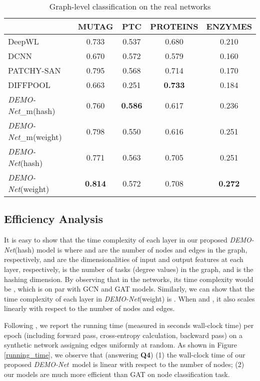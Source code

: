 \documentclass[sigconf]{acmart}
\newcommand{\demonet}{{\emph {DEMO-Net}}}
\begin{document}
\begin{table}
    \centering
    \caption{Graph-level classification on the real networks}
    \small
    \begin{tabular}{|l|c|c|c|c|}
    \hline
         &  MUTAG & PTC  & PROTEINS & ENZYMES   \\ \hline
         DeepWL~\cite{yanardag2015deep} & 0.733 & 0.537  & 0.680  & 0.210   \\ \hline
         DCNN~\cite{atwood2016diffusion}   & 0.670  & 0.572 & 0.579   & 0.160  \\ \hline
         PATCHY-SAN~\cite{niepert2016learning} & 0.795  & 0.568  & 0.714  & 0.170   \\ \hline
         DIFFPOOL~\cite{ying2018hierarchical} & 0.663  & 0.251 & \textbf{0.733 } & 0.184  \\ \hline
         \hline
         \demonet\_m(hash)   & 0.760  & \textbf{0.586}  & 0.617  & 0.236  \\ \hline
         \demonet\_m(weight)   & 0.798  & 0.550  & 0.616 &  0.251 \\ \hline
         \demonet (hash)   & 0.771  & 0.563  & 0.705 & 0.251  \\ \hline
         \demonet (weight) & \textbf{0.814} & 0.572 & 0.708  & \textbf{0.272} \\ \hline
    \end{tabular}
    \label{tab:graph_classification}
    \vspace{-3mm}
\end{table}





\subsection{Efficiency Analysis}
It is easy to show that the time complexity of each layer in our proposed \demonet (hash) model is  where  and  are the number of nodes and edges in the graph, respectively,  and  are the dimensionalities of input and output features at each layer, respectively,  is the number of tasks (degree values) in the graph, and  is the hashing dimension. By observing that  in the networks, its time complexity would be , which is on par with GCN and GAT models. Similarly, we can show that the time complexity of each layer in \demonet(weight) is . When  and , it also scales linearly with respect to the number of nodes and edges.

Following \cite{kipf2016semi}, we report the running time (measured in seconds wall-clock time) per epoch (including forward pass, cross-entropy calculation, backward pass) on a synthetic network assigning  edges uniformly at random. As shown in Figure \ref{running_time}, we observe that (answering \textbf{Q4}) (1) the wall-clock time of our proposed \demonet\ model is linear with respect to the number of nodes; (2) our models are much more efficient than GAT on node classification task.
\end{document}
